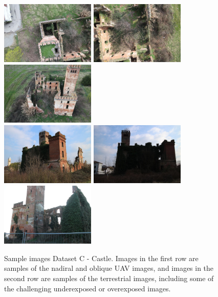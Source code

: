 \begin{figure}
  \centering
    \includegraphics[height=3cm]{castle_img_1}
    \includegraphics[height=3cm]{castle_img_2}
    \includegraphics[height=3cm]{castle_img_3} \\
    \includegraphics[height=3cm]{castle_img_4}
    \includegraphics[height=3cm]{castle_img_5}
    \includegraphics[height=3cm]{castle_img_6}
  \caption{Sample images Dataset C - Castle. Images in the first row are samples of the nadiral and oblique UAV images, and images in the second row are samples of the terrestrial images, including some of the challenging underexposed or overexposed images.}
  \label{fig:5:castle_img}
\end{figure}


